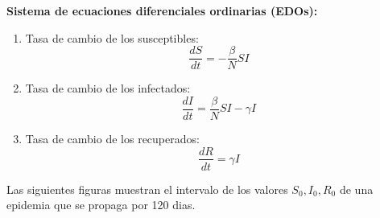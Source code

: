         \textbf{Sistema de ecuaciones diferenciales ordinarias (EDOs):}
        \begin{enumerate}
            
            \item  Tasa de cambio de los susceptibles:
               \[
               \frac{dS}{dt} = -\frac{\beta}{N} S I
               \]
            \item Tasa de cambio de los infectados:
                  \[
                  \frac{dI}{dt} = \frac{\beta}{N} S I - \gamma I
                  \]
            \item Tasa de cambio de los recuperados:
                \[
                \frac{dR}{dt} = \gamma I
                \]
               
        \end{enumerate}

        Las siguientes figuras muestran el intervalo de los valores $S_0,I_0,R_0$ de una epidemia que se propaga por 120 dias. \\

